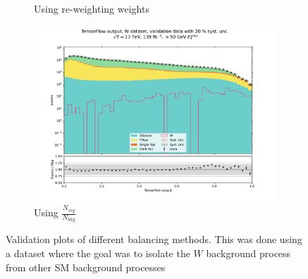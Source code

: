 \documentclass[12pt, a4paper]{book}
\begin{document}
\begin{figure}[!ht]
\begin{subfigure}[b]{0.49\textwidth}
         \caption{Using re-weighting weights}\label{fig:WVALMC}
      \end{subfigure}
      \begin{subfigure}[b]{0.49\textwidth}
         \centering
         \includegraphics[width=1\textwidth]{Balanced/VAL.pdf}
         \caption{Using $\frac{N_{sig}}{N_{bkg}}$}\label{fig:WVALW}
      \end{subfigure}
      \caption[Validation plots for different balancing methods on NN]{Validation plots of different balancing methods. 
      This was done using a dataset where the goal was to isolate the $W$ background process from other SM background processes}\label{fig:WVAL}
\end{figure}
\end{document}
